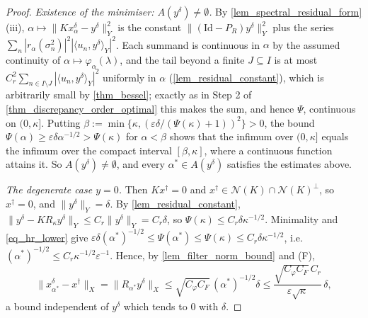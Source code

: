 \documentclass[a4paper]{report}
\theoremstyle{plain}
\theoremstyle{definition}
\theoremstyle{remark}
\newcommand{\Ker}{\mathcal{N}}
\newcommand{\Id}{\mathrm{Id}}
\newcommand{\dg}{^{\dagger}}
\begin{document}
\begin{proof}
  \emph{Existence of the minimiser: $A(y^{\delta}) \ne \emptyset$.}  By
  \cref{lem_spectral_residual_form}(iii), $\alpha \mapsto \|Kx^{\delta}_{\alpha} -
  y^{\delta}\|_Y^{2}$ is the constant $\|(\Id-P_R)y^{\delta}\|_Y^{2}$ plus the series
  $\sum_n |r_{\alpha}(\sigma_n^{2})|^{2}|\langle u_n,y^{\delta}\rangle_Y|^{2}$.  Each
  summand is continuous in $\alpha$ by the assumed continuity of $\alpha \mapsto
  \varphi_{\alpha}(\lambda)$, and the tail beyond a finite $J \subseteq I$ is at most
  $C_r^{2}\sum_{n \in I \setminus J}|\langle u_n,y^{\delta}\rangle_Y|^{2}$ uniformly in
  $\alpha$ (\cref{lem_residual_constant}), which is arbitrarily small by
  \cref{thm_bessel}; exactly as in Step 2 of \cref{thm_discrepancy_order_optimal} this
  makes the sum, and hence $\Psi$, continuous on $(0,\kappa]$.  Putting $\beta :=
  \min\{\kappa, (\varepsilon\delta/(\Psi(\kappa)+1))^{2}\} > 0$, the bound
  $\Psi(\alpha) \ge \varepsilon\delta\alpha^{-1/2} > \Psi(\kappa)$ for $\alpha < \beta$
  shows that the infimum over $(0,\kappa]$ equals the infimum over the compact interval
  $[\beta,\kappa]$, where a continuous function attains it.  So $A(y^{\delta}) \ne
  \emptyset$, and every $\alpha^{*} \in A(y^{\delta})$ satisfies the estimates above.

  \emph{The degenerate case $y = 0$.}  Then $Kx\dg = 0$ and $x\dg \in \Ker(K) \cap
  \Ker(K)^{\perp}$, so $x\dg = 0$, and $\|y^{\delta}\|_Y = \delta$.  By
  \cref{lem_residual_constant}, $\|y^{\delta} - KR_{\kappa}y^{\delta}\|_Y \le
  C_r\|y^{\delta}\|_Y = C_r\delta$, so $\Psi(\kappa) \le C_r\delta\kappa^{-1/2}$.
  Minimality and \eqref{eq_hr_lower} give $\varepsilon\delta(\alpha^{*})^{-1/2} \le
  \Psi(\alpha^{*}) \le \Psi(\kappa) \le C_r\delta\kappa^{-1/2}$, i.e.\
  $(\alpha^{*})^{-1/2} \le C_r\kappa^{-1/2}\varepsilon^{-1}$.  Hence, by
  \cref{lem_filter_norm_bound} and (F),
  \[
    \|x^{\delta}_{\alpha^{*}} - x\dg\|_X = \|R_{\alpha^{*}}y^{\delta}\|_X
      \le \sqrt{C_{\varphi}C_F}\,(\alpha^{*})^{-1/2}\delta
      \le \frac{\sqrt{C_{\varphi}C_F}\,C_r}{\varepsilon\sqrt{\kappa}}\,\delta ,
  \]
  a bound independent of $y^{\delta}$ which tends to $0$ with $\delta$.


\end{proof}
\end{document}
